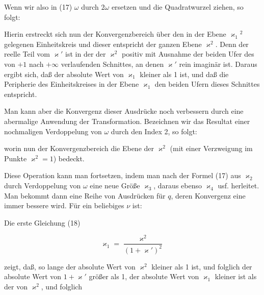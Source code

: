 
Wenn wir also in (17) $\omega$ durch $2\omega$ ersetzen und die Quadratwurzel ziehen, so folgt:


Hierin erstreckt sich nun der Konvergenzbereich \"uber den in der Ebene $\varkappa_1{}^2$ gelegenen Einheitskreis und dieser entspricht der ganzen Ebene $\varkappa^2$. Denn der reelle Teil vom $\varkappa'$ ist in der  der $\varkappa^2$ positiv mit Ausnahme der beiden Ufer des von $+1$ nach $+\infty$ verlaufenden Schnittes, an denen $\varkappa'$ rein imagin\"ar ist. Daraus ergibt sich, da\ss{} der absolute Wert von $\varkappa_1$ kleiner als 1 ist, und da\ss{} die Peripherie des Einheitskreises in der Ebene $\varkappa_1$ den beiden Ufern dieses Schnittes entspricht.

Man kann aber die Konvergenz dieser Ausdr\"ucke noch verbessern durch eine abermalige Anwendung der  Transformation. Bezeichnen wir das Resultat einer nochmaligen Verdoppelung von $\omega$ durch den Index 2, so folgt:


worin nun der Konvergenzbereich die Ebene der $\varkappa^2$  (mit einer Verzweigung im Punkte $\varkappa^2=1$) bedeckt.

Diese Operation kann man fortsetzen, indem man nach der Formel (17) aus $\varkappa_2$ durch Verdoppelung von $\omega$ eine neue Gr\"o\ss{}e $\varkappa_3$, daraus ebenso $\varkappa_4$ usf. herleitet. Man bekommt dann eine Reihe von Ausdr\"ucken f\"ur $q$, deren Konvergenz eine immer bessere wird. F\"ur ein beliebiges $\nu$ ist:


Die erste Gleichung (18)

\[
\varkappa_1 = \frac{\varkappa^2}{(1+\varkappa')^2}
\]

zeigt, da\ss{}, so lange der absolute Wert von $\varkappa^2$ kleiner als 1 ist, und folglich der absolute Wert von $1+\varkappa'$ gr\"o\ss{}er als 1, der absolute Wert von $\varkappa_1$ kleiner ist als der von $\varkappa^2$, und folglich
